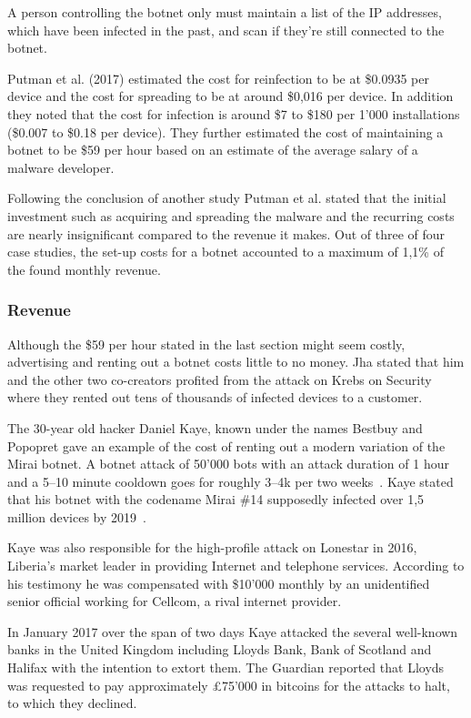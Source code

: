A person controlling the botnet only must maintain a list of the IP addresses, which have been infected in the past, and scan if they're still connected to the botnet.

Putman et al. (2017) estimated the cost for reinfection to be at \$0.0935 per device and the cost for spreading to be at around \$0,016 per device.
In addition they noted that the cost for infection is around \$7 to \$180 per 1'000 installations (\$0.007 to \$0.18 per device).
They further estimated the cost of maintaining a botnet to be \$59 per hour based on an estimate of the average salary of a malware developer.\cite{Putman}

Following the conclusion of another study Putman et al.
stated that the initial investment such as acquiring and spreading the malware and the recurring costs are nearly insignificant compared to the revenue it makes.
Out of three of four case studies, the set-up costs for a botnet accounted to a maximum of 1,1\% of the found monthly revenue.\cite{Putman}

\subsubsection{Revenue}
Although the \$59 per hour stated in the last section might seem costly, advertising and renting out a botnet costs little to no money.
Jha stated that him and the other two co-creators profited from the attack on Krebs on Security where they rented out tens of thousands of infected devices to a customer.\cite{Krebs20}

The 30-year old hacker Daniel Kaye, known under the names Bestbuy and Popopret gave an example of the cost of renting out a modern variation of the Mirai botnet.
A botnet attack of 50'000 bots with an attack duration of 1 hour and a 5--10 minute cooldown goes for roughly 3--4k per two weeks~\cite{Paganini16}.
Kaye stated that his botnet with the codename Mirai \#14 supposedly infected over 1,5 million devices by 2019~\cite{Cimpanu17}.

Kaye was also responsible for the high-profile attack on Lonestar in 2016, Liberia's market leader in providing Internet and telephone services.
According to his testimony he was compensated with \$10'000 monthly by an unidentified senior official working for Cellcom, a rival internet provider.\cite{Krebs21}

In January 2017 over the span of two days Kaye attacked the several well-known banks in the United Kingdom including Lloyds Bank, Bank of Scotland and Halifax with the intention to extort them.
The Guardian reported that Lloyds was requested to pay approximately \pounds 75'000 in bitcoins for the attacks to halt, to which they declined.\cite{Collison17}


